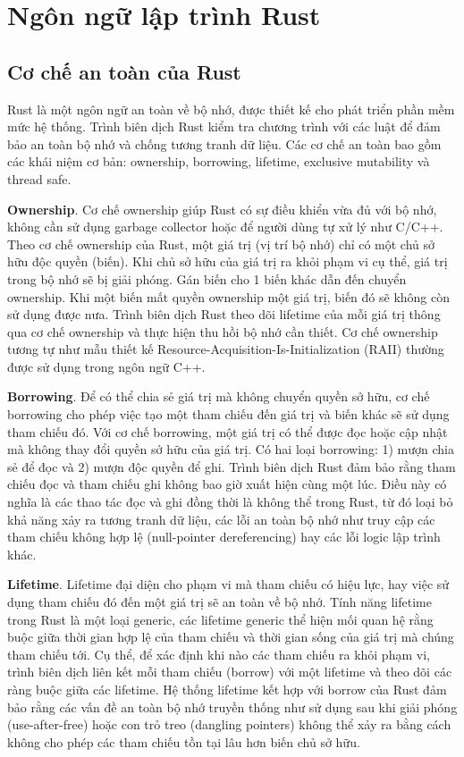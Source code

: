 \section{Ngôn ngữ lập trình Rust}

\subsection{Cơ chế an toàn của Rust}

Rust là một ngôn ngữ an toàn về bộ nhớ, được thiết kế cho phát triển phần mềm mức hệ thống.
Trình biên dịch Rust kiểm tra chương trình với các luật để đảm bảo an toàn bộ nhớ và chống tương tranh dữ liệu.
Các cơ chế an toàn bao gồm các khái niệm cơ bản: ownership, borrowing, lifetime, exclusive mutability và thread safe.

\textbf{Ownership}. Cơ chế ownership giúp Rust có sự điều khiển vừa đủ với bộ nhớ, không cần sử dụng garbage collector hoặc để người dùng tự xử lý như C/C++.
Theo cơ chế ownership của Rust, một giá trị (vị trí bộ nhớ) chỉ có một chủ sở hữu độc quyền (biến).
Khi chủ sở hữu của giá trị ra khỏi phạm vi cụ thể, giá trị trong bộ nhớ sẽ bị giải phóng.
Gán biến cho 1 biến khác dẫn đến chuyển ownership.
Khi một biến mất quyền ownership một giá trị, biến đó sẽ không còn sử dụng được nưa.
Trình biên dịch Rust theo dõi lifetime của mỗi giá trị thông qua cơ chế ownership và thực hiện thu hồi bộ nhớ cần thiết.
Cơ chế ownership tương tự như mẫu thiết kế Resource-Acquisition-Is-Initialization (RAII) \cite{cppreferenceRAIICppreferencecom} thường được sử dụng trong ngôn ngữ C++.

\textbf{Borrowing}. Để có thể chia sẻ giá trị mà không chuyển quyền sở hữu, cơ chế borrowing cho phép việc tạo một tham chiếu đến giá trị và biến khác sẽ sử dụng tham chiếu đó.
Với cơ chế borrowing, một giá trị có thể được đọc hoặc cập nhật mà không thay đổi quyền sở hữu của giá trị.
Có hai loại borrowing: 1) mượn chia sẻ để đọc và 2) mượn độc quyền để ghi.
Trình biên dịch Rust đảm bảo rằng tham chiếu đọc và tham chiếu ghi không bao giờ xuất hiện cùng một lúc.
Điều này có nghĩa là các thao tác đọc và ghi đồng thời là không thể trong Rust, từ đó loại bỏ khả năng xảy ra tương tranh dữ liệu, các lỗi an toàn bộ nhớ như truy cập các tham chiếu không hợp lệ (null-pointer dereferencing) hay các lỗi logic lập trình khác.

\textbf{Lifetime}. Lifetime đại diện cho phạm vi mà tham chiếu có hiệu lực, hay việc sử dụng tham chiếu đó đến một giá trị sẽ an toàn về bộ nhớ.
Tính năng lifetime trong Rust là một loại generic, các lifetime generic thể hiện mối quan hệ rằng buộc giữa thời gian hợp lệ của tham chiếu và thời gian sống của giá trị mà chúng tham chiếu tới.
Cụ thể, để xác định khi nào các tham chiếu ra khỏi phạm vi, trình biên dịch liên kết mỗi tham chiếu (borrow) với một lifetime và theo dõi các ràng buộc giữa các lifetime.
Hệ thống lifetime kết hợp với borrow của Rust đảm bảo rằng các vấn đề an toàn bộ nhớ truyền thống như sử dụng sau khi giải phóng (use-after-free) hoặc con trỏ treo (dangling pointers) không thể xảy ra bằng cách không cho phép các tham chiếu tồn tại lâu hơn biến chủ sở hữu.

